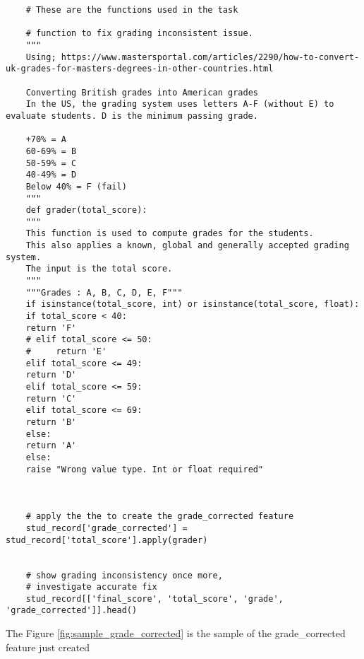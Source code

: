 \begin{verbatim}
	# These are the functions used in the task
	
	# function to fix grading inconsistent issue.
	"""
	Using; https://www.mastersportal.com/articles/2290/how-to-convert-uk-grades-for-masters-degrees-in-other-countries.html
	
	Converting British grades into American grades
	In the US, the grading system uses letters A-F (without E) to evaluate students. D is the minimum passing grade.
	
	+70% = A
	60-69% = B
	50-59% = C
	40-49% = D
	Below 40% = F (fail)
	"""
	def grader(total_score):
	"""
	This function is used to compute grades for the students. 
	This also applies a known, global and generally accepted grading system.
	The input is the total score.
	"""
	"""Grades : A, B, C, D, E, F"""
	if isinstance(total_score, int) or isinstance(total_score, float):
	if total_score < 40:
	return 'F'
	# elif total_score <= 50:
	#     return 'E' 
	elif total_score <= 49:
	return 'D' 
	elif total_score <= 59:
	return 'C'
	elif total_score <= 69:
	return 'B' 
	else:
	return 'A'
	else:
	raise "Wrong value type. Int or float required" 
	
	
	
	# apply the the to create the grade_corrected feature
	stud_record['grade_corrected'] = stud_record['total_score'].apply(grader)
	
	
	# show grading inconsistency once more, 
	# investigate accurate fix
	stud_record[['final_score', 'total_score', 'grade', 'grade_corrected']].head()
\end{verbatim}

The Figure \ref{fig:sample_grade_corrected} is the sample of the grade\_corrected feature just created